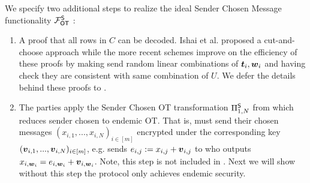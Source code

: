 We specify two additional steps to realize the ideal Sender Chosen Message functionality $\mathcal{F}_{\mathsf{OT}}^\mathsf{S}$ \cite{C:IKNP03,EC:ALSZ15,C:KelOrsSch15,RSA:OrrOrsSch17}:
\begin{enumerate}

	\item A proof that all rows in $C$ can be decoded. Ishai et al. \cite{C:IKNP03} proposed a cut-and-choose approach while the more recent schemes \cite{C:KelOrsSch15,RSA:OrrOrsSch17} improve on the efficiency of these proofs by making \rec send random linear combinations of $\boldsymbol{t}_i,\boldsymbol{w}_i$ and having \send check they are consistent with same combination of $U$. We defer the details behind these proofs to \cite{C:KelOrsSch15,RSA:OrrOrsSch17}.
	
	\item The parties apply the Sender Chosen OT transformation $\Pi^{\mathsf{S}}_{1,N}$ from  which reduces sender chosen to endemic OT. That is, \send must send their chosen messages $(x_{i,1},...,x_{i,N})_{i\in [m]}$ encrypted under the corresponding key $(\boldsymbol{v}_{i,1},...,\boldsymbol{v}_{i,N})_{i\in [m]}$, e.g. \send sends $e_{i,j}:=x_{i,j}+\boldsymbol{v}_{i,j}$ to \rec who outputs $x_{i,\boldsymbol{w}_i}=e_{i,\boldsymbol{w}_i}+\boldsymbol{v}_{i,\boldsymbol{w}_i}$. Note, this step is not included in . Next we will show without this step the protocol only achieves endemic security.
\end{enumerate}




